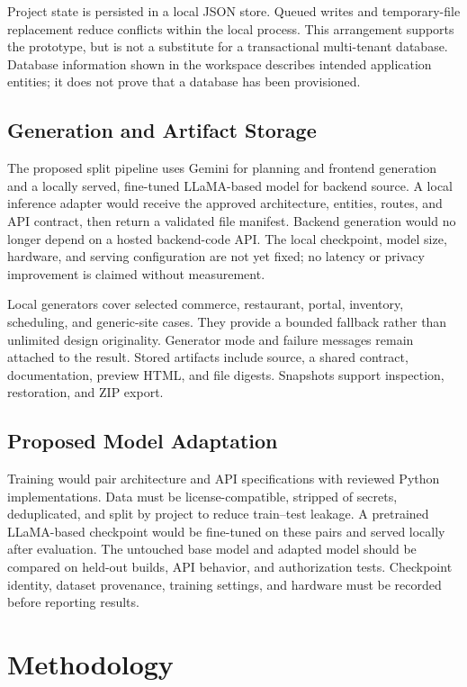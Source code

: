\documentclass[conference,a4paper]{IEEEtran}
\begin{document}
Project state is persisted in a local JSON store. Queued writes and temporary-file replacement reduce conflicts within the local process. This arrangement supports the prototype, but is not a substitute for a transactional multi-tenant database. Database information shown in the workspace describes intended application entities; it does not prove that a database has been provisioned.

\subsection{Generation and Artifact Storage}
The proposed split pipeline uses Gemini for planning and frontend generation and a locally served, fine-tuned LLaMA-based model for backend source. A local inference adapter would receive the approved architecture, entities, routes, and API contract, then return a validated file manifest. Backend generation would no longer depend on a hosted backend-code API. The local checkpoint, model size, hardware, and serving configuration are not yet fixed; no latency or privacy improvement is claimed without measurement.

Local generators cover selected commerce, restaurant, portal, inventory, scheduling, and generic-site cases. They provide a bounded fallback rather than unlimited design originality. Generator mode and failure messages remain attached to the result. Stored artifacts include source, a shared contract, documentation, preview HTML, and file digests. Snapshots support inspection, restoration, and ZIP export.

\subsection{Proposed Model Adaptation}
Training would pair architecture and API specifications with reviewed Python implementations. Data must be license-compatible, stripped of secrets, deduplicated, and split by project to reduce train--test leakage. A pretrained LLaMA-based checkpoint would be fine-tuned on these pairs and served locally after evaluation. The untouched base model and adapted model should be compared on held-out builds, API behavior, and authorization tests. Checkpoint identity, dataset provenance, training settings, and hardware must be recorded before reporting results.

\section{Methodology}
\end{document}

